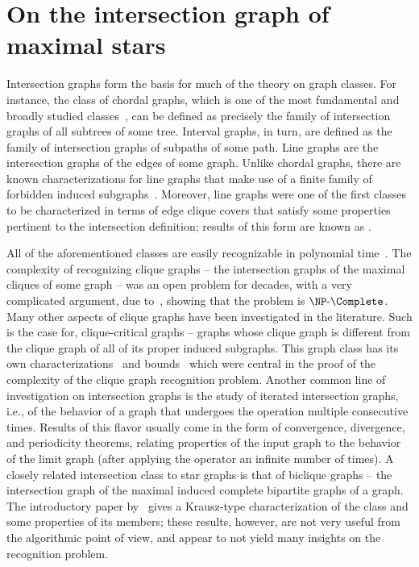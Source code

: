\chapter{On the intersection graph of maximal stars}
\label{ch:star_graph}


Intersection graphs form the basis for much of the theory on graph classes.
For instance, the class of chordal graphs, which is one of the most fundamental and broadly studied classes~\cite{classes_survey}, can be defined as precisely the family of intersection graphs of all subtrees of some tree.
Interval graphs, in turn, are defined as the family of intersection graphs of subpaths of some path.
Line graphs are the intersection graphs of the edges of some graph.
Unlike chordal graphs, there are known characterizations for line graphs that make use of a finite family of forbidden induced subgraphs~\citep{line_nich}.
Moreover, line graphs were one of the first classes to be characterized in terms of edge clique covers that satisfy some properties pertinent to the intersection definition; results of this form are known as .

All of the aforementioned classes are easily recognizable in polynomial time~\cite{classes_survey,line_naor}.
The complexity of recognizing clique graphs -- the intersection graphs of the maximal cliques of some graph -- was an open problem for decades, with a very complicated argument, due to~\cite{clique_recognition}, showing that the problem is $\NPc$.
Many other aspects of clique graphs have been investigated in the literature.
Such is the case for, clique-critical graphs -- graphs whose clique graph is different from the clique graph of all of its proper induced subgraphs.
This graph class has its own characterizations~\cite{clique_critical_toft} and bounds~\cite{clique_critical_alcon} which were central in the proof of the complexity of the clique graph recognition problem.
Another common line of investigation on intersection graphs is the study of iterated intersection graphs, i.e., of the behavior of a graph that undergoes the operation multiple consecutive times.
Results of this flavor usually come in the form of convergence, divergence, and periodicity theorems, relating properties of the input graph to the behavior of the limit graph (after applying the operator an infinite number of times).
A closely related intersection class to star graphs is that of biclique graphs -- the intersection graph of the maximal induced complete bipartite graphs of a graph.
The introductory paper by~\cite{biclique_graph} gives a Krausz-type characterization of the class and some properties of its members; these results, however, are not very useful from the algorithmic point of view, and appear to not yield many insights on the recognition problem.

